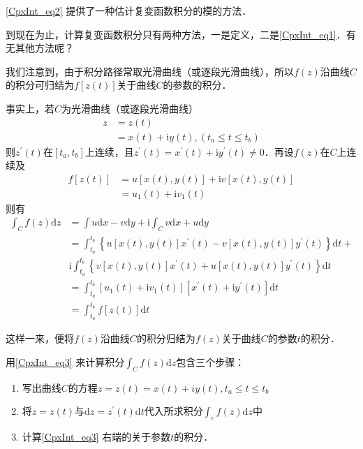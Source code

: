 \autoref{CpxInt_eq2} 提供了一种估计复变函数积分的模的方法．

到现在为止，计算复变函数积分只有两种方法，一是定义，二是\autoref{CpxInt_eq1}．有无其他方法呢？

我们注意到，由于积分路径常取光滑曲线（或逐段光滑曲线），所以$ f (z) $沿曲线$C $的积分可归结为$f [z(t)]$关于曲线$C$的参数的积分．

事实上，若$C$为光滑曲线（或逐段光滑曲线）
\begin{equation}
\begin{aligned} z &=z(t) \\ &=x(t)+\mathrm{i} y(t),(t_a \leqslant t \leqslant t_b) \end{aligned}
\end{equation}
则$z^\prime(t)$在$[t_a, t_b]$上连续，且$z^\prime(t) = x^\prime(t) + \mathrm iy^\prime(t) \neq  0$．再设$ f (z)$在$C$上连续及
\begin{equation}
\begin{aligned} f[z(t)] &=u[x(t), y(t)]+\mathrm{i} v[x(t), y(t)] \\ &=u_{1}(t)+\mathrm{i} v_{1}(t) \end{aligned}
\end{equation}
则有
\begin{equation} \label{CpxInt_eq3}
\begin{aligned} \int_{C} f(z) \mathrm{d} z &=\int u \mathrm{d} x-v \mathrm{d} y+\mathrm{i} \int_{C} v \mathrm{d} x+u \mathrm{d} y \\ &=\int_{t_a}^{t_b}\left\{u[x(t), y(t)] x^{\prime}(t)-v[x(t), y(t)] y^{\prime}(t)\right\} \mathrm{d} t+\\ & \mathrm{i} \int_{t_a}^{t_b}\left\{v[x(t), y(t)] x^{\prime}(t)+u[x(t), y(t)] y^{\prime}(t)\right\} \mathrm{d} t \\ &=\int_{t_a}^{t_b}\left[u_{1}(t)+\mathrm{i} v_{1}(t)\right]\left[x^{\prime}(t)+\mathrm{i} y^{\prime}(t)\right] \mathrm{d} t \\ &=\int_{t_a}^{t_b} f[z(t)] \mathrm{d} t \end{aligned}
\end{equation}

这样一来，便将$ f (z)$沿曲线$C$的积分归结为$ f (z)$关于曲线$C$的参数$t$的积分．

用\autoref{CpxInt_eq3} 来计算积分$\displaystyle \int_{C} f(z) \mathrm{d} z$包含三个步骤：
\begin{enumerate}
\item 写出曲线$C$的方程$z=z(t)=x(t)+i y(t), t_a \leqslant t \leqslant t_b$
\item 将$ z = z(t)$与$\mathrm{d}z = z^\prime (t)\mathrm{d}t $代入所求积分$\displaystyle \int_{c} f(z) \mathrm{d} z$中
\item 计算\autoref{CpxInt_eq3} 右端的关于参数$t$的积分．
\end{enumerate}

